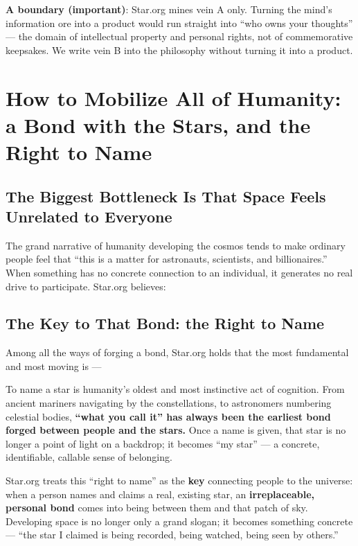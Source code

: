 \documentclass[11pt,fontset=none]{ctexart}
\begin{document}
\textbf{A boundary (important)}: Star.org mines vein A only. Turning the mind's information ore into a product would run straight into ``who owns your thoughts'' --- the domain of intellectual property and personal rights, not of commemorative keepsakes. We write vein B into the philosophy without turning it into a product.


\section{How to Mobilize All of Humanity: a Bond with the Stars, and the Right to Name}

\subsection{The Biggest Bottleneck Is That Space Feels Unrelated to Everyone}

The grand narrative of humanity developing the cosmos tends to make ordinary people feel that ``this is a matter for astronauts, scientists, and billionaires.'' When something has no concrete connection to an individual, it generates no real drive to participate. Star.org believes:


\subsection{The Key to That Bond: the Right to Name}

Among all the ways of forging a bond, Star.org holds that the most fundamental and most moving is —


To name a star is humanity's oldest and most instinctive act of cognition. From ancient mariners navigating by the constellations, to astronomers numbering celestial bodies, \textbf{``what you call it'' has always been the earliest bond forged between people and the stars.} Once a name is given, that star is no longer a point of light on a backdrop; it becomes ``my star'' — a concrete, identifiable, callable sense of belonging.

Star.org treats this ``right to name'' as the \textbf{key} connecting people to the universe: when a person names and claims a real, existing star, an \textbf{irreplaceable, personal bond} comes into being between them and that patch of sky. Developing space is no longer only a grand slogan; it becomes something concrete — ``the star I claimed is being recorded, being watched, being seen by others.''
\end{document}

